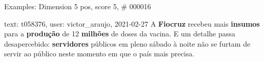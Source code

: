\begin{frame}{Examples: Dimension 5 pos, score 5, \# 000016}
\footnotesize
\begin{exampleblock}{text: t058376, user: victor\_araujo, 2021-02-27}
A \textbf{Fiocruz} recebeu mais \textbf{insumos} para a \textbf{produção} de 12 
\textbf{milhões} de doses da vacina. E um detalhe passa desapercebido: 
\textbf{servidores} públicos em pleno sábado à noite não se furtam de servir ao 
público neste momento em que o país mais precisa. 
\end{exampleblock}
\end{frame}
